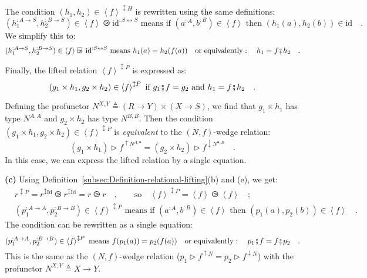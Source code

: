 The condition $(h_{1},h_{2})\in\left<f\right>^{\updownarrow H}$ is
rewritten using the same definitions:
\[
(h_{1}^{:A\rightarrow S},h_{2}^{:B\rightarrow S})\in\left<f\right>\ogreaterthan\text{id}^{:S\leftrightarrow S}\text{ means if }(a^{:A},b^{:B})\in\left<f\right>\text{ then }(h_{1}(a),h_{2}(b))\in\text{id}\quad.
\]
We simplify this to:
\[
(h_{1}^{:A\rightarrow S},h_{2}^{:B\rightarrow S})\in\left<f\right>\ogreaterthan\text{id}^{:S\leftrightarrow S}\text{ means }h_{1}(a)=h_{2}(f(a))\quad\text{or equivalently}:\quad h_{1}=f\bef h_{2}\quad.
\]

Finally, the lifted relation $\left<f\right>^{\updownarrow P}$ is
expressed as:
\[
(g_{1}\times h_{1},g_{2}\times h_{2})\in\left<f\right>^{\updownarrow P}\text{ if }g_{1}\bef f=g_{2}\text{ and }h_{1}=f\bef h_{2}\quad.
\]

Defining the profunctor $N^{X,Y}\triangleq\left(R\rightarrow Y\right)\times\left(X\rightarrow S\right)$,
we find that $g_{1}\times h_{1}$ has type $N^{A,A}$ and $g_{2}\times h_{2}$
has type $N^{B,B}$. Then the condition $(g_{1}\times h_{1},g_{2}\times h_{2})\in\left<f\right>^{\updownarrow P}$
is \emph{equivalent} to the $\left(N,f\right)$-wedge relation:
\[
(g_{1}\times h_{1})\triangleright f^{\uparrow N^{A,\bullet}}=(g_{2}\times h_{2})\triangleright f^{\downarrow N^{\bullet,B}}\quad.
\]
In this case, we can express the lifted relation by a single equation.

\textbf{(c)} Using Definition~\ref{subsec:Definition-relational-lifting}(b)
and (e), we get:
\begin{align*}
 & r^{\updownarrow P}=r^{\updownarrow\text{Id}}\ogreaterthan r^{\updownarrow\text{Id}}=r\ogreaterthan r\quad,\quad\quad\text{so}\quad\left<f\right>^{\updownarrow P}=\left<f\right>\ogreaterthan\left<f\right>\quad;\\
 & (p_{1}^{:A\rightarrow A},p_{2}^{:B\rightarrow B})\in\left<f\right>^{\updownarrow P}\text{ means if }(a^{:A},b^{:B})\in\left<f\right>\text{ then }(p_{1}(a),p_{2}(b))\in\left<f\right>\quad.
\end{align*}
The condition can be rewritten as a single equation:
\[
(p_{1}^{:A\rightarrow A},p_{2}^{:B\rightarrow B})\in\left<f\right>^{\updownarrow P}\text{ means }f(p_{1}(a))=p_{2}(f(a))\quad\text{or equivalently}:\quad p_{1}\bef f=f\bef p_{2}\quad.
\]
This is the same as the $\left(N,f\right)$-wedge relation ($p_{1}\triangleright f^{\uparrow N}=p_{2}\triangleright f^{\downarrow N}$)
with the profunctor $N^{X,Y}\triangleq X\rightarrow Y$.

